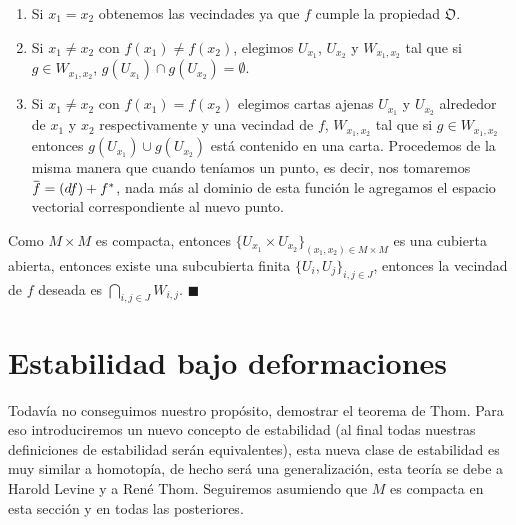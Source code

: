 \documentclass{report}
\theoremstyle{definition}
\newcommand{\overbar}[1]{\mkern 1.5mu\overline{\mkern-1.5mu#1\mkern-1.5mu}\mkern 1.5mu}
\begin{document}
\begin{enumerate}
\item Si $x_1 = x_2$ obtenemos las vecindades ya que $f$ cumple la propiedad $\mathfrak{O}$.
\item Si $x_1 \neq x_2$ con $f(x_1) \neq f(x_2)$, elegimos $U_{x_1}$, $U_{x_2}$ y $W_{x_1, x_2}$ tal que si $g \in W_{x_1, x_2}$, $g(U_{x_1} ) \cap g(U_{x_2}) = \emptyset$.
\item Si $x_1 \neq x_2$ con $f(x_1) = f(x_2)$ elegimos cartas  ajenas $U_{x_1} $ y $U_{x_2}$ alrededor de $x_1$ y $x_2$ respectivamente y una vecindad de $f$, $W_{x_1, x_2}$ tal que si $g \in W_{x_1, x_2}$ entonces $g(U_{x_1}) \cup g(U_{x_2})$ est\'a contenido en una carta. Procedemos de la misma manera que cuando ten\'iamos un punto, es decir, nos tomaremos $\overbar{f} = (df) + f^\ast$, nada m\'as al dominio de esta funci\'on le agregamos el espacio vectorial correspondiente al nuevo punto.
\end{enumerate}

Como $M \times M$ es compacta, entonces $\{ U_{x_1} \times U_{x_2} \}_{(x_1, x_2) \in M \times M}$ es una cubierta abierta, entonces existe una subcubierta finita $\{U_i , U_j \}_{i,j \in J}$, entonces la vecindad de $f$ deseada es $\bigcap\limits_{i,j \in J} W_{i,j}$. $\blacksquare$





\section{Estabilidad bajo deformaciones}

Todav\'ia no conseguimos nuestro prop\'osito, demostrar el teorema de Thom. Para eso introduciremos un nuevo concepto de estabilidad (al final todas nuestras definiciones de estabilidad ser\'an equivalentes), esta nueva clase de estabilidad es muy similar a homotop\'ia, de hecho ser\'a una generalizaci\'on, esta teor\'ia se debe a Harold Levine y a Ren\'e Thom. Seguiremos asumiendo que $M$ es compacta en esta secci\'on y en todas las posteriores.
\end{document}
